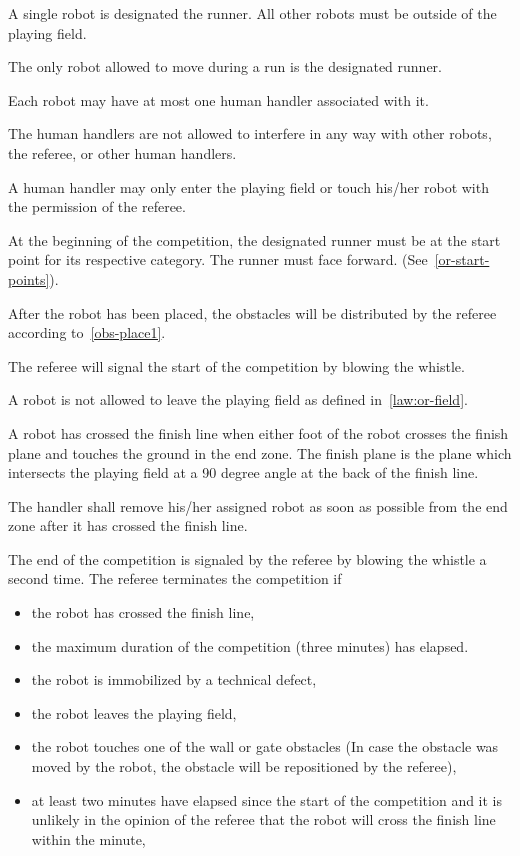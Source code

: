 \documentclass[12pt]{hurocup}
\begin{document}
\begin{lawlist}[OR]

\item A single robot is designated the runner. All other robots
  must be outside of the playing field.
\item The only robot allowed to move during a run is the
  designated runner.
\item Each robot may have at most one human handler associated with
  it. 
\item \label{or-handler5} The human handlers are not allowed to
  interfere in any way with other robots, the referee, or other human
  handlers.
\item \label{or-handler6} A human handler may only enter the playing
  field or touch his/her robot with the permission of the referee.
\item At the beginning of the competition, the designated runner must
  be at the start point for its respective category. The runner must
  face forward. (See~\ref{or-start-points}).
\item After the robot has been placed, the obstacles will be
  distributed by the referee according
  to~\ref{obs-place1}.
\item The referee will signal the start of the competition by blowing
  the whistle.
\item A robot is not allowed to leave the playing field as defined
  in~\ref{law:or-field}. 
\item A robot has crossed the finish line when either foot of the
  robot crosses the finish plane and touches the ground in the end
  zone. The finish plane is the plane which intersects the playing
  field at a 90 degree angle at the back of the finish line.
\item The handler shall remove his/her assigned robot as soon as
  possible from the end zone after it has crossed the finish line.
\item The end of the competition is signaled by the referee by
  blowing the whistle a second time.
  The referee terminates the competition if
  \begin{itemize}
  \item the robot has crossed the finish line,
  \item the maximum duration of the competition (three minutes) has
    elapsed. 
  \item the robot is immobilized by a technical defect,
  \item the robot leaves the playing field,
  \item the robot touches one of the wall or gate obstacles (In case
    the obstacle was moved by the robot, the obstacle will be
    repositioned by the referee),  
  \item at least two minutes have elapsed since the start of the
    competition and it is unlikely in the opinion of the referee that
    the robot will cross the finish line within the minute,
  \end{itemize}
\end{lawlist}
\end{document}
